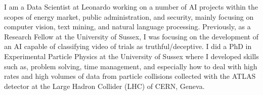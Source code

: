 
I am a Data Scientist at Leonardo working on a number of AI projects within the scopes of energy market, public administration, and security, mainly focusing on computer vision, text mining, and natural language processing. Previously, as a Research Fellow at the University of Sussex, I was focusing on the development of an AI capable of classifying video of trials as truthful/deceptive. I did a PhD in Experimental Particle Physics at the University of Sussex where I developed skills such as, problem solving, time management, and especially how to deal with high rates and high volumes of data from particle collisions collected with the ATLAS detector at the Large Hadron Collider (LHC) of CERN, Geneva. 


